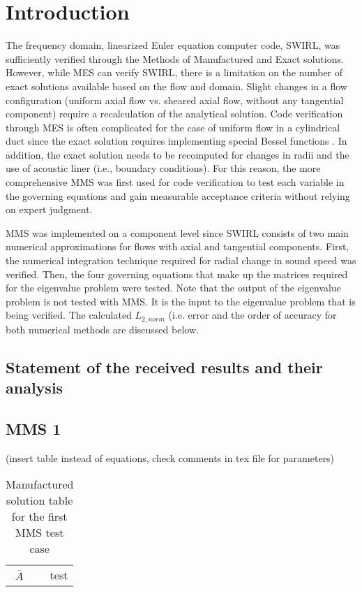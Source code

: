 \section{Introduction}
The frequency domain, linearized Euler equation computer code, SWIRL, was 
sufficiently verified through the Methods of Manufactured and Exact solutions. 
However, while MES can verify SWIRL, there is a limitation on the number of 
exact solutions available based on the flow and domain. Slight changes in a 
flow configuration (uniform axial flow vs. sheared axial flow, without any tangential 
component) require a recalculation of the analytical solution. Code verification 
through MES is often complicated for the case of uniform flow in a cylindrical 
duct since the exact solution requires implementing special Bessel functions
. In addition, the exact solution needs to be recomputed for changes in radii 
and the use of acoustic liner (i.e., boundary conditions). For this reason, 
the more comprehensive MMS was first used for code verification to test each 
variable in the governing equations and gain measurable acceptance criteria 
without relying on expert judgment.

MMS was implemented on a component level since SWIRL consists
of two main numerical approximations for flows with axial and tangential 
components. First, the numerical integration technique required for radial 
change in sound speed was verified. Then, the four governing equations that make
up the matrices required for the eigenvalue problem were tested. Note that the 
output of the eigenvalue problem is not tested with MMS. It is the input to the 
eigenvalue problem that is being verified. The calculated $L_{2,norm}$ (i.e.
error and the order of accuracy for both numerical methods are discussed below.

\subsection{Statement of the received results and their analysis}


\subsection{MMS 1}

(insert table instead of equations, check comments in tex file for parameters)
\begin{table}[h!]
    \centering
    \begin{tabular}{c|r}
        $\bar{A}$ & test
    \end{tabular}
    \caption{Manufactured solution table for the first MMS test case}
    \label{tab:MMS1_input}
\end{table}


